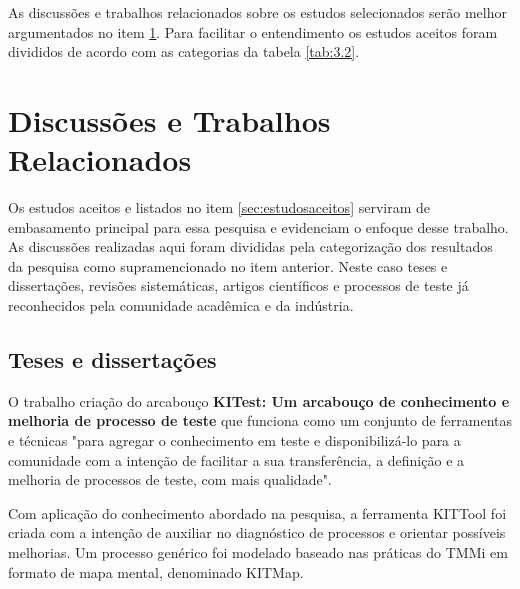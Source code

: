 \begin{table}[ht]
\centering
\caption{Quantitativo dos principais trabalhos aceitos para essa pesquisa.}
\label{tab:3.2}
\end{table}

As discussões e trabalhos relacionados sobre os estudos selecionados serão melhor argumentados no item \ref{sec:discussoes}. Para facilitar o entendimento os estudos aceitos foram divididos de acordo com as categorias da tabela \ref{tab:3.2}.

\section{Discussões e Trabalhos Relacionados}
\label{sec:discussoes}

Os estudos aceitos e listados no item \ref{sec:estudosaceitos} serviram de embasamento principal para essa pesquisa e evidenciam o enfoque desse trabalho. As discussões realizadas aqui foram divididas pela categorização dos resultados da pesquisa como supramencionado no item anterior. Neste caso teses e dissertações, revisões sistemáticas, artigos científicos e processos de teste já reconhecidos pela comunidade acadêmica e da indústria.

\subsection{Teses e dissertações}
\label{sec:tesesdissertacoes}

O trabalho criação do arcabouço \textbf{KITest: Um arcabouço de conhecimento e melhoria de processo de teste} \cite{Nina2011} que funciona como um conjunto de ferramentas e técnicas "para agregar o conhecimento em teste e disponibilizá-lo para a comunidade com a intenção de facilitar a sua transferência, a definição e a melhoria de processos de teste, com mais qualidade". 

Com aplicação do conhecimento abordado na pesquisa, a ferramenta KITTool foi criada com a intenção de auxiliar no diagnóstico de processos e orientar possíveis melhorias. Um processo genérico foi modelado baseado nas práticas do TMMi em formato de mapa mental, denominado KITMap.

